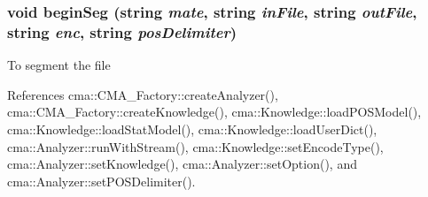 \subsubsection{\setlength{\rightskip}{0pt plus 5cm}void beginSeg (string {\em mate}, \/  string {\em inFile}, \/  string {\em outFile}, \/  string {\em enc}, \/  string {\em posDelimiter})}\label{SeggerCMD_8h_b30a0cc7bae3e3976cb797d3f026c20b}


To segment the file 

References cma::CMA\_\-Factory::createAnalyzer(), cma::CMA\_\-Factory::createKnowledge(), cma::Knowledge::loadPOSModel(), cma::Knowledge::loadStatModel(), cma::Knowledge::loadUserDict(), cma::Analyzer::runWithStream(), cma::Knowledge::setEncodeType(), cma::Analyzer::setKnowledge(), cma::Analyzer::setOption(), and cma::Analyzer::setPOSDelimiter().